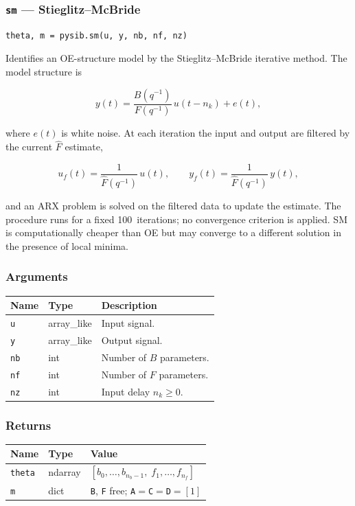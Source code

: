 \documentclass[../main]{subfiles}
\begin{document}
\newpage

\subsubsection{\texttt{sm} --- Stieglitz--McBride}

\begin{lstlisting}
theta, m = pysib.sm(u, y, nb, nf, nz)
\end{lstlisting}

Identifies an OE-structure model by the Stieglitz--McBride iterative
method.  The model structure is

\[
  y(t) = \frac{B(q^{-1})}{F(q^{-1})}\,u(t - n_k) + e(t),
\]

where $e(t)$ is white noise.
At each iteration the input and output are filtered by the current
$\hat{F}$ estimate,

\[
  u_f(t) = \frac{1}{\hat{F}(q^{-1})}\,u(t), \qquad
  y_f(t) = \frac{1}{\hat{F}(q^{-1})}\,y(t),
\]

and an ARX problem is solved on the filtered data to update the
estimate.  The procedure runs for a fixed 100~iterations; no
convergence criterion is applied.
SM is computationally cheaper than OE but may converge to a
different solution in the presence of local minima.

\subsubsection*{Arguments}
\begin{center}
\begin{tabular}{lll}
  \toprule
  Name & Type & Description \\
  \midrule
  \texttt{u}  & array\_like & Input signal. \\
  \texttt{y}  & array\_like & Output signal. \\
  \texttt{nb} & int & Number of $B$ parameters. \\
  \texttt{nf} & int & Number of $F$ parameters. \\
  \texttt{nz} & int & Input delay $n_k \geq 0$. \\
  \bottomrule
\end{tabular}
\end{center}

\subsubsection*{Returns}
\begin{center}
\begin{tabular}{lll}
  \toprule
  Name & Type & Value \\
  \midrule
  \texttt{theta} & ndarray & $[b_0,\ldots,b_{n_b-1},\; f_1,\ldots,f_{n_f}]$ \\
  \texttt{m}     & dict    & \texttt{B}, \texttt{F} free; \texttt{A}$=$\texttt{C}$=$\texttt{D}$=[1]$ \\
  \bottomrule
\end{tabular}
\end{center}
\end{document}

